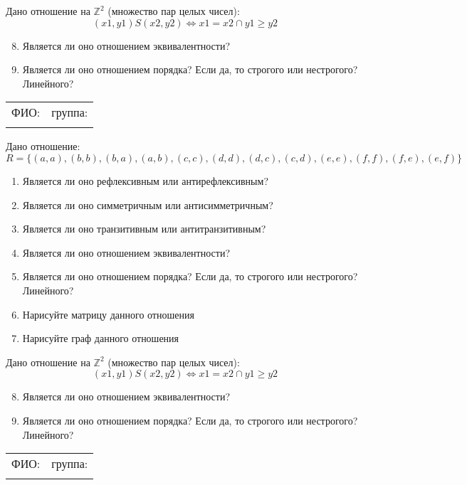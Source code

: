 \documentclass[russian,12pt]{article}
\begin{document}
Дано отношение на $\mathbb{Z}^2$ (множество пар целых чисел):
$$(x1, y1)S(x2, y2) \iff x1 = x2 \cap y1 \ge y2$$
\begin{enumerate}
\setcounter{enumi}{7}
\item Является ли оно отношением эквивалентности?
\item Является ли оно отношением порядка? Если да, то строгого или нестрогого? Линейного?
\end{enumerate}
\newpage
\thispagestyle{empty}
\begin{tabular}{|p{}|p{}|}
\hline
ФИО: & группа: \\
 & \\ \hline
\end{tabular}

\vspace{12pt}

Дано отношение:
$$R = \{(a, a), (b, b), (b, a), (a, b), (c, c), (d, d), (d, c), (c, d), (e, e), (f, f), (f, e), (e, f)\}$$
\begin{enumerate}
\item Является ли оно рефлексивным или антирефлексивным?
\item Является ли оно симметричным или антисимметричным?
\item Является ли оно транзитивным или антитранзитивным?
\item Является ли оно отношением эквивалентности?
\item Является ли оно отношением порядка? Если да, то строгого или нестрогого? Линейного?
\item Нарисуйте матрицу данного отношения
\item Нарисуйте граф данного отношения
\end{enumerate}

Дано отношение на $\mathbb{Z}^2$ (множество пар целых чисел):
$$(x1, y1)S(x2, y2) \iff x1 = x2 \cap y1 \ge y2$$
\begin{enumerate}
\setcounter{enumi}{7}
\item Является ли оно отношением эквивалентности?
\item Является ли оно отношением порядка? Если да, то строгого или нестрогого? Линейного?
\end{enumerate}
\newpage
\thispagestyle{empty}
\begin{tabular}{|p{}|p{}|}
\hline
ФИО: & группа: \\
 & \\ \hline
\end{tabular}
\end{document}
